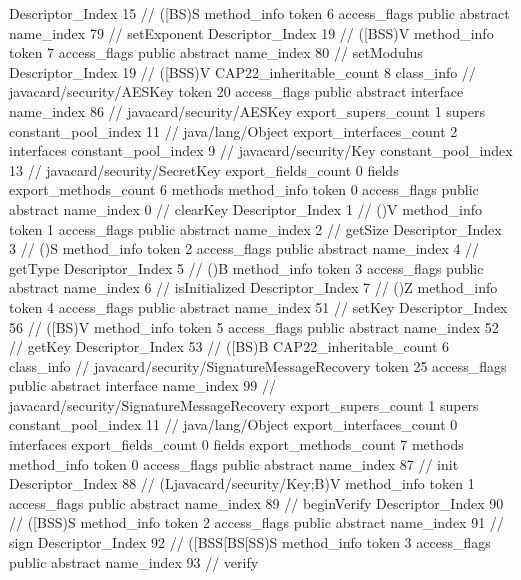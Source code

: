 {{{{{					Descriptor_Index	15		// ([BS)S
				}
				method_info {
					token	6
					access_flags	public abstract
					name_index	79		// setExponent
					Descriptor_Index	19		// ([BSS)V
				}
				method_info {
					token	7
					access_flags	public abstract
					name_index	80		// setModulus
					Descriptor_Index	19		// ([BSS)V
				}
			}
			CAP22_inheritable_count	8
		}
		class_info {		// javacard/security/AESKey
			token	20
			access_flags	public abstract interface
			name_index	86		// javacard/security/AESKey
			export_supers_count	1
			supers {
				constant_pool_index	11		// java/lang/Object
			}
			export_interfaces_count	2
			interfaces {
				constant_pool_index	9		// javacard/security/Key
				constant_pool_index	13		// javacard/security/SecretKey
			}
			export_fields_count	0
			fields {
			}
			export_methods_count	6
			methods {
				method_info {
					token	0
					access_flags	public abstract
					name_index	0		// clearKey
					Descriptor_Index	1		// ()V
				}
				method_info {
					token	1
					access_flags	public abstract
					name_index	2		// getSize
					Descriptor_Index	3		// ()S
				}
				method_info {
					token	2
					access_flags	public abstract
					name_index	4		// getType
					Descriptor_Index	5		// ()B
				}
				method_info {
					token	3
					access_flags	public abstract
					name_index	6		// isInitialized
					Descriptor_Index	7		// ()Z
				}
				method_info {
					token	4
					access_flags	public abstract
					name_index	51		// setKey
					Descriptor_Index	56		// ([BS)V
				}
				method_info {
					token	5
					access_flags	public abstract
					name_index	52		// getKey
					Descriptor_Index	53		// ([BS)B
				}
			}
			CAP22_inheritable_count	6
		}
		class_info {		// javacard/security/SignatureMessageRecovery
			token	25
			access_flags	public abstract interface
			name_index	99		// javacard/security/SignatureMessageRecovery
			export_supers_count	1
			supers {
				constant_pool_index	11		// java/lang/Object
			}
			export_interfaces_count	0
			interfaces {
			}
			export_fields_count	0
			fields {
			}
			export_methods_count	7
			methods {
				method_info {
					token	0
					access_flags	public abstract
					name_index	87		// init
					Descriptor_Index	88		// (Ljavacard/security/Key;B)V
				}
				method_info {
					token	1
					access_flags	public abstract
					name_index	89		// beginVerify
					Descriptor_Index	90		// ([BSS)S
				}
				method_info {
					token	2
					access_flags	public abstract
					name_index	91		// sign
					Descriptor_Index	92		// ([BSS[BS[SS)S
				}
				method_info {
					token	3
					access_flags	public abstract
					name_index	93		// verify
}}}}}
